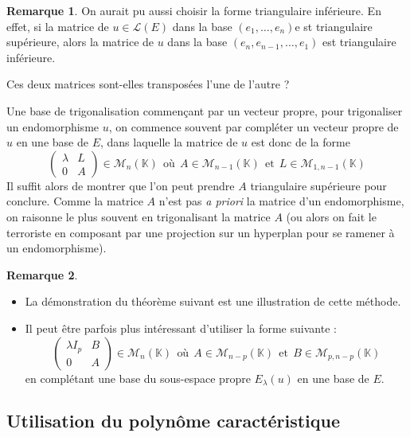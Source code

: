 \documentclass[french]{article}
\newcommand{\K}{\mathbb{K}}
\theoremstyle{plain}
\theoremstyle{definition}
\newtheorem*{rmq}{Remarque}
\theoremstyle{remark}
\begin{document}
	\begin{rmq}
		On aurait pu aussi choisir la forme triangulaire inférieure. En effet, si la matrice de $u\in\mathcal{L}(E)$ dans la base $(e_1,\ldots,e_n)$e st triangulaire supérieure, alors la matrice de $u$ dans la base $(e_n,e_{n-1},\ldots,e_1)$ est triangulaire inférieure.
	\end{rmq}
	
	\begin{exo}
		Ces deux matrices sont-elles transposées l'une de l'autre ? %
	\end{exo}
	
	\begin{met}
		Une base de trigonalisation commençant par un vecteur propre, pour trigonaliser un endomorphisme $u$, on commence souvent par compléter un vecteur propre de $u$ en une base de $E$, dans laquelle la matrice de $u$ est donc de la forme $$\begin{pmatrix}
			\lambda&L\\
			0&A
		\end{pmatrix}\in\mathcal{M}_n(\K) \ \ \text{où}\ \ A\in\mathcal{M}_{n-1}(\K)\ \ \text{et} \ \ L\in\mathcal{M}_{1,n-1}(\K)$$ Il suffit alors de montrer que l'on peut prendre $A$ triangulaire supérieure pour conclure. Comme la matrice $A$ n'est pas \textit{a priori} la matrice d'un endomorphisme, on raisonne le plus souvent en trigonalisant la matrice $A$ (ou alors on fait le terroriste en composant par une projection sur un hyperplan pour se ramener à un endomorphisme).
	\end{met}
	
	\begin{rmq}
		\begin{itemize}
			\item La démonstration du théorème suivant est une illustration de cette méthode.
			\item Il peut être parfois plus intéressant d'utiliser la forme suivante : 
			$$\begin{pmatrix}
				\lambda I_p&B\\
				0&A
			\end{pmatrix}\in\mathcal{M}_n(\K) \ \ \text{où}\ \ A\in\mathcal{M}_{n-p}(\K)\ \ \text{et} \ \ B\in\mathcal{M}_{p,n-p}(\K)$$ en complétant une base du sous-espace propre $E_\lambda(u)$ en une base de $E$.
		\end{itemize}
	\end{rmq}
	
	\subsection{Utilisation du polynôme caractéristique}
	
\end{document}
